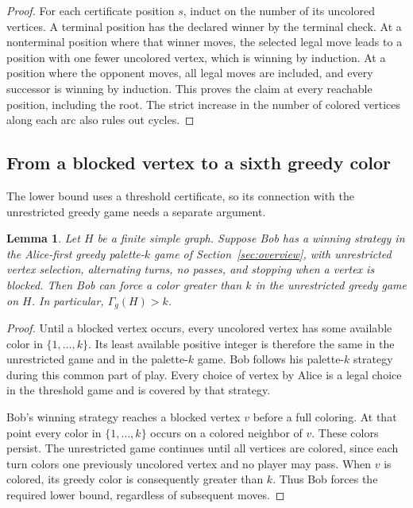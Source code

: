 \documentclass[11pt]{article}
\newtheorem{lemma}{Lemma}
\newcommand{\Gammag}{\Gamma_g}
\begin{document}
\begin{proof}
For each certificate position $s$, induct on the number of its uncolored
vertices. A terminal position has the declared winner by the terminal
check. At a nonterminal position where that winner moves, the selected
legal move leads to a position with one fewer uncolored vertex, which
is winning by induction. At a position where the opponent moves, all
legal moves are included, and every successor is winning by induction.
This proves the claim at every reachable position, including the root.
The strict increase in the number of colored vertices along each arc
also rules out cycles.
\end{proof}

\subsection{From a blocked vertex to a sixth greedy color}
The lower bound uses a threshold certificate, so its connection with the
unrestricted greedy game needs a separate argument.

\begin{lemma}\label{lem:bridge}
Let $H$ be a finite simple graph. Suppose Bob has a winning strategy in
the Alice-first greedy palette-$k$ game of
Section~\ref{sec:overview}, with unrestricted vertex selection,
alternating turns, no passes, and stopping when a vertex is blocked.
Then Bob can force a color greater than $k$ in the unrestricted greedy
game on $H$. In particular, $\Gammag(H)>k$.
\end{lemma}

\begin{proof}
Until a blocked vertex occurs, every uncolored vertex has some available
color in $\{1,\ldots,k\}$. Its least available positive integer is
therefore the same in the unrestricted game and in the palette-$k$
game. Bob follows his palette-$k$ strategy during this common part of
play. Every choice of vertex by Alice is a legal choice in the threshold
game and is covered by that strategy.

Bob's winning strategy reaches a blocked vertex $v$ before a full
coloring. At that point every color in $\{1,\ldots,k\}$ occurs on a
colored neighbor of $v$. These colors persist. The unrestricted game
continues until all vertices are colored, since each turn colors one
previously uncolored vertex and no player may pass. When $v$ is colored,
its greedy color is consequently greater than $k$. Thus Bob forces
the required lower bound, regardless of subsequent moves.
\end{proof}
\end{document}
